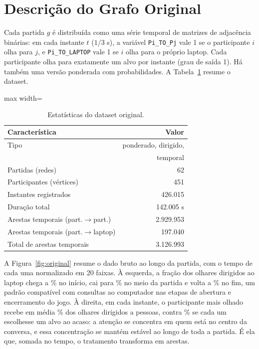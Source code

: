 \documentclass[sigconf]{webmedia}
\begin{document}
\section{Descrição do Grafo Original}
\label{sec:descricao}
Cada partida $g$ é distribuída como uma série temporal de matrizes de adjacência binárias: em cada instante $t$ ($1/3$ s), a variável \texttt{Pi\_TO\_Pj} vale 1 se o participante $i$ olha para $j$, e \texttt{Pi\_TO\_LAPTOP} vale 1 se $i$ olha para o próprio laptop. Cada participante olha para exatamente um alvo por instante (grau de saída 1). Há também uma versão ponderada com probabilidades. A Tabela~\ref{tab:dataset} resume o dataset.

\begin{table}[h]
  \caption{Estatísticas do dataset original.}
  \label{tab:dataset}
  \begin{adjustbox}{max width=\columnwidth}
  \begin{tabular}{lr}
    \toprule
    Característica & Valor \\
    \midrule
    Tipo & ponderado, dirigido,\\ & temporal \\
    Partidas (redes) & 62 \\
    Participantes (vértices) & 451 \\
    Instantes registrados & 426.015 \\
    Duração total & 142.005 s \\
    Arestas temporais (part.$\to$part.) & 2.929.953 \\
    Arestas temporais (part.$\to$laptop) & 197.040 \\
    Total de arestas temporais & 3.126.993 \\
    \bottomrule
  \end{tabular}
  \end{adjustbox}
\end{table}

A Figura~\ref{fig:original} resume o dado bruto ao longo da partida, com o tempo de cada uma normalizado em 20 faixas. À esquerda, a fração dos olhares dirigidos ao laptop chega a \laptopInicio\% no início, cai para \laptopMeio\% no meio da partida e volta a \laptopFim\% no fim, um padrão compatível com consultas ao computador nas etapas de abertura e encerramento do jogo. À direita, em cada instante, o participante mais olhado recebe em média \focoMedio\% dos olhares dirigidos a pessoas, contra \focoAcaso\% se cada um escolhesse um alvo ao acaso: a atenção se concentra em quem está no centro da conversa, e essa concentração se mantém estável ao longo de toda a partida. É ela que, somada no tempo, o tratamento transforma em arestas.
\end{document}
